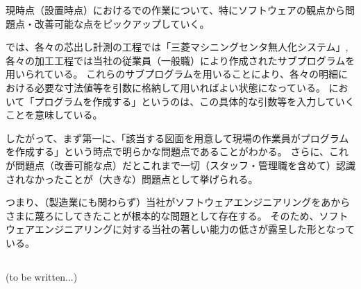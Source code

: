 

現時点（\DMname 設置時点）における\MMname での作業について、特にソフトウェアの観点から問題点・改善可能な点をピックアップしていく。



\MMname では、各々の芯出し計測の工程では「三菱マシニングセンタ無人化システム」, 各々の加工工程では当社の従業員（一般職）により作成されたサブプログラムを用いられている。
これらのサブプログラムを用いることにより、各々の明細における必要な寸法値等を引数に格納して用いればよい状態になっている。
\MMname において「プログラムを作成する」というのは、この具体的な引数等を入力していくことを意味している。

したがって、まず第一に、「該当する図面を用意して現場の作業員がプログラムを作成する」という時点で明らかな問題点であることがわかる。
さらに、これが問題点（改善可能な点）だとこれまで一切（スタッフ・管理職を含めて）認識されなかったことが（大きな）問題点として挙げられる。

つまり、（製造業にも関わらず）当社がソフトウェアエンジニアリングをあからさまに蔑ろにしてきたことが根本的な問題として存在する。
そのため、ソフトウェアエンジニアリングに対する当社の著しい能力の低さが露呈した形となっている。



\subsection{\TBW}
(to be written...)
